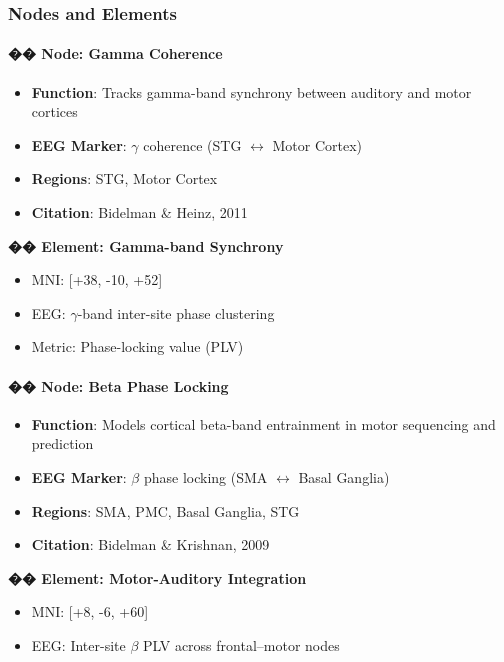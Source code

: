 \documentclass[10pt]{article}
\begin{document}
\subsubsection*{Nodes and Elements}

\paragraph{�� Node: Gamma Coherence}

\begin{itemize}
    \item \textbf{Function}: Tracks gamma-band synchrony between auditory and motor cortices
    \item \textbf{EEG Marker}: $\gamma$ coherence (STG $\leftrightarrow$ Motor Cortex)
    \item \textbf{Regions}: STG, Motor Cortex
    \item \textbf{Citation}: Bidelman \& Heinz, 2011
\end{itemize}

\textbf{�� Element: Gamma-band Synchrony}

\begin{itemize}
    \item MNI: [+38, -10, +52]
    \item EEG: $\gamma$-band inter-site phase clustering
    \item Metric: Phase-locking value (PLV)
\end{itemize}

\paragraph{�� Node: Beta Phase Locking}

\begin{itemize}
    \item \textbf{Function}: Models cortical beta-band entrainment in motor sequencing and prediction
    \item \textbf{EEG Marker}: $\beta$ phase locking (SMA $\leftrightarrow$ Basal Ganglia)
    \item \textbf{Regions}: SMA, PMC, Basal Ganglia, STG
    \item \textbf{Citation}: Bidelman \& Krishnan, 2009
\end{itemize}

\textbf{�� Element: Motor-Auditory Integration}

\begin{itemize}
    \item MNI: [+8, -6, +60]
    \item EEG: Inter-site $\beta$ PLV across frontal–motor nodes
\end{itemize}
\end{document}
